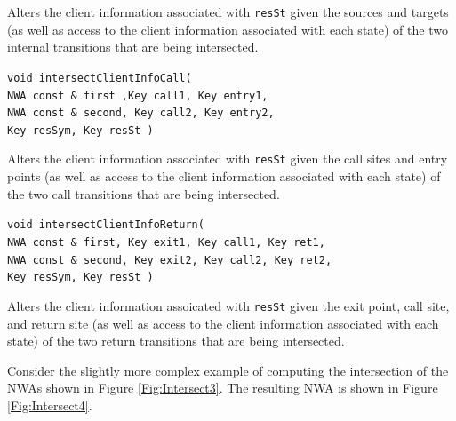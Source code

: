 \begin{description}
    Alters the client information associated with \texttt{resSt} given the
    sources and targets (as well as access to the client information
    associated with each state) of the two internal transitions that are
    being intersected.

  \item\texttt{void intersectClientInfoCall( \\ \hspace*{3.25cm}
    NWA const \& first ,Key call1, Key entry1,\\ \hspace*{3.25cm}
    NWA const \& second, Key call2, Key entry2,\\ \hspace*{3.25cm} Key
    resSym, Key resSt )} \nopagebreak

    Alters the client information associated with \texttt{resSt} given the
    call sites and entry points (as well as access to the client information
    associated with each state) of the two call transitions that are being
    intersected.

  \item\texttt{void intersectClientInfoReturn( \\ \hspace*{1.75cm}
    NWA const \& first, Key exit1, Key call1, Key ret1,\\ \hspace*{1.75cm}
    NWA const \& second, Key exit2, Key call2, Key ret2,\\ \hspace*{1.75cm}
    Key resSym, Key resSt )} \nopagebreak

    Alters the client information assoicated with \texttt{resSt} given the
    exit point, call site, and return site (as well as access to the client
    information associated with each state) of the two return transitions
    that are being intersected. \\

\end{description}


Consider the slightly more complex example of computing the intersection of
the NWAs shown in Figure \ref{Fig:Intersect3}.  The resulting NWA is shown in
Figure \ref{Fig:Intersect4}.

